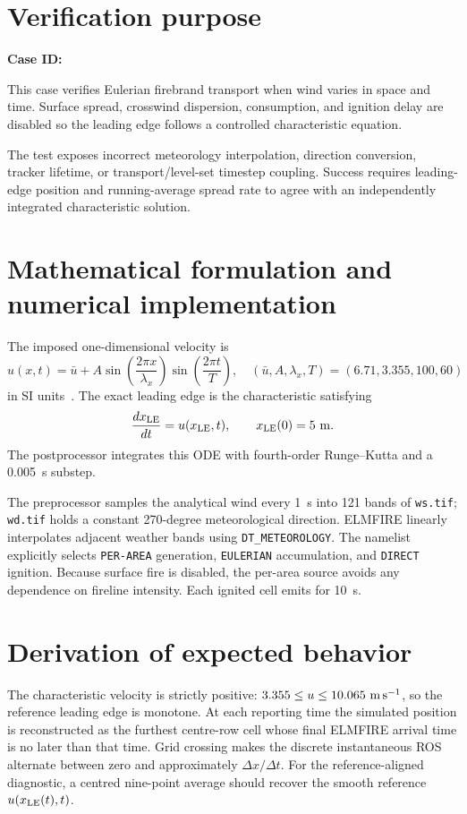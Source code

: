 \section{Verification purpose}

\textbf{Case ID:} \CaseID

This case verifies Eulerian firebrand transport when wind varies in space and time. Surface spread, crosswind dispersion, consumption, and ignition delay are disabled so the leading edge follows a controlled characteristic equation.

The test exposes incorrect meteorology interpolation, direction conversion, tracker lifetime, or transport/level-set timestep coupling. Success requires leading-edge position and running-average spread rate to agree with an independently integrated characteristic solution.

\section{Mathematical formulation and numerical implementation}
The imposed one-dimensional velocity is
\begin{equation}
 u(x,t)=\bar u+A\sin\left(\frac{2\pi x}{\lambda_x}\right)
                 \sin\left(\frac{2\pi t}{T}\right),
 \quad
 (\bar u,A,\lambda_x,T)=(6.71,3.355,100,60)
\end{equation}
in SI units~\cite{Qin2025}. The exact leading edge is the characteristic satisfying
\begin{equation}
 \frac{dx_{\rm LE}}{dt}=u(x_{\rm LE},t),\qquad x_{\rm LE}(0)=5~{\rm m}.
\end{equation}
The postprocessor integrates this ODE with fourth-order Runge--Kutta and a
\SI{0.005}{s} substep.

The preprocessor samples the analytical wind every \SI{1}{s} into 121 bands of
\texttt{ws.tif}; \texttt{wd.tif} holds a constant 270-degree meteorological
direction. ELMFIRE linearly interpolates adjacent weather bands using
\texttt{DT\_METEOROLOGY}. The namelist explicitly selects \texttt{PER-AREA}
generation, \texttt{EULERIAN} accumulation, and \texttt{DIRECT} ignition.
Because surface fire is disabled, the per-area source avoids any dependence on
fireline intensity. Each ignited cell emits for \SI{10}{s}.

\section{Derivation of expected behavior}
The characteristic velocity is strictly positive:
$3.355\le u\le10.065~{\rm m\,s^{-1}}$, so the reference leading edge is
monotone. At each reporting time the simulated position is reconstructed as the
furthest centre-row cell whose final ELMFIRE arrival time is no later than that
time. Grid crossing makes the discrete instantaneous ROS alternate between zero
and approximately $\Delta x/\Delta t$. For the reference-aligned diagnostic, a centred
nine-point average should recover the smooth reference $u(x_{\rm LE}(t),t)$.

